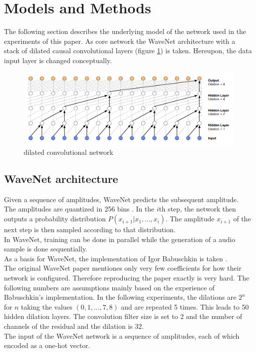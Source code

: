 \documentclass[10pt,conference,compsocconf]{IEEEtran}
\begin{document}
\section{Models and Methods}
The following section describes the underlying model of the network used in the experiments of this paper. As core network the WaveNet architecture with a stack of dilated causal convolutional layers (figure \ref{fig:wavenet_dilated_cnn}) is taken. Hereupon, the data input layer is changed conceptually.
\begin{figure}[tbp]
  \centering
  \includegraphics[width=\columnwidth]{figures/wavenet_dilated_cnn.png}
  \caption{dilated convolutional network}
  \label{fig:wavenet_dilated_cnn}
\end{figure}

\subsection{WaveNet architecture}
Given a sequence of amplitudes, WaveNet predicts the subsequent amplitude. The amplitudes are quantized in 256 bins \cite{itu1988711}. In the $i$th step, the network then outputs a probability distribution $P(x_{i+1} | x_1, ..., x_i)$. The amplitude $x_{i+1}$ of the next step is then sampled according to that distribution.\\
In WaveNet, training can be done in parallel while the generation of a audio sample is done sequentially.\\
As a basis for WaveNet, the implementation of Igor Babuschkin is taken \cite{Babuschkin2016}.\\
The original WaveNet paper mentiones only very few coefficients for how their network is configured. Therefore reproducing the paper exactly is very hard. The following numbers are assumptions mainly based on the experience of Babuschkin's implementation. In the following experiments, the dilations are $2^n$ for $n$ taking the values $(0,1,...,7,8)$ and are repeated 5 times. This leads to 50 hidden dilation layers. The convolution filter size is set to $2$ and the number of channels of the residual and the dilation is $32$.\\
The input of the WaveNet network is a sequence of amplitudes, each of which encoded as a one-hot vector.
\end{document}

